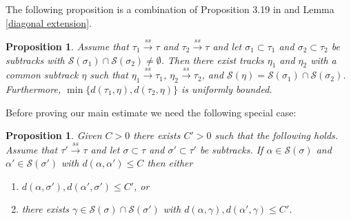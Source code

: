 \documentclass[11pt]{article}
\newtheorem{prop}[thm]{Proposition}
\theoremstyle{remark}
\def\S{{\mathcal S}}
\def\ss{{\overset{ss}\longrightarrow}}
\begin{document}
The following proposition is a combination of Proposition 3.19 in \cite{BB} and Lemma \ref{diagonal extension}.
\begin{prop}\label{intersection}
Assume that $\tau_1 \ss \tau$ and $\tau_2 \ss \tau$ and let $\sigma_1 \subset \tau_1$ and $\sigma_2\subset \tau_2$ be subtracks with $\S(\sigma_1)\cap \S(\sigma_2) \neq \emptyset$. Then there exist tracks $\eta_1$ and $\eta_2$ with a common subtrack $\eta$ such that $\eta_1 \ss \tau_1$, $\eta_2\ss\tau_2$, and $\S(\eta) = \S(\sigma_1) \cap \S(\sigma_2)$. Furthermore, $\min\{d(\tau_1, \eta), d(\tau_2, \eta)\}$
is uniformly bounded.
\end{prop}



Before proving our main estimate we need the following special case:
\begin{prop}\label{nested}
Given $C>0$ there exists $C'>0$ such that the following holds. Assume that $\tau' \ss\tau$ and let $\sigma \subset \tau$ and $\sigma' \subset \tau'$ be subtracks. If $\alpha \in \S(\sigma)$ and $\alpha'\in\S(\sigma')$ with $d(\alpha, \alpha') \le C$ then either
\begin{enumerate}[(1)]
\item $d(\alpha, \sigma'), d(\alpha', \sigma') \le C'$, or
\item there exists $\gamma \in \S(\sigma) \cap \S(\sigma')$ with $d(\alpha, \gamma), d(\alpha', \gamma) \le C'$.
\end{enumerate}
\end{prop}
\end{document}
